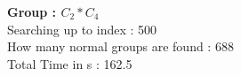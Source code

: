\textbf{Group : $C_2*C_4$}\\
Searching up to index : 500\\
How many normal groups are found : 688\\
Total Time in s : 162.5\\

